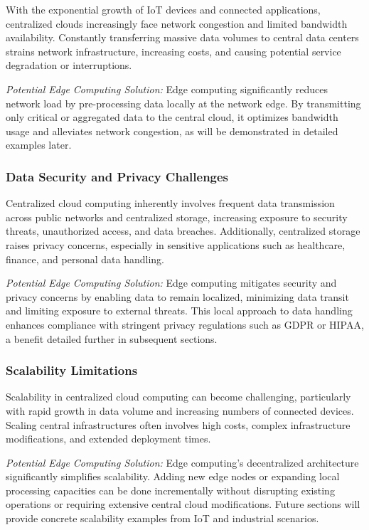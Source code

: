 \documentclass[runningheads]{llncs}
\begin{document}
With the exponential growth of IoT devices and connected applications, centralized clouds increasingly face network congestion and limited bandwidth availability. Constantly transferring massive data volumes to central data centers strains network infrastructure, increasing costs, and causing potential service degradation or interruptions.




\noindent\textit{Potential Edge Computing Solution:} Edge computing significantly reduces network load by pre-processing data locally at the network edge. By transmitting only critical or aggregated data to the central cloud, it optimizes bandwidth usage and alleviates network congestion, as will be demonstrated in detailed examples later.

\subsubsection{Data Security and Privacy Challenges}
Centralized cloud computing inherently involves frequent data transmission across public networks and centralized storage, increasing exposure to security threats, unauthorized access, and data breaches. Additionally, centralized storage raises privacy concerns, especially in sensitive applications such as healthcare, finance, and personal data handling.

\noindent\textit{Potential Edge Computing Solution:} Edge computing mitigates security and privacy concerns by enabling data to remain localized, minimizing data transit and limiting exposure to external threats. This local approach to data handling enhances compliance with stringent privacy regulations such as GDPR or HIPAA, a benefit detailed further in subsequent sections.

\subsubsection{Scalability Limitations}
Scalability in centralized cloud computing can become challenging, particularly with rapid growth in data volume and increasing numbers of connected devices. Scaling central infrastructures often involves high costs, complex infrastructure modifications, and extended deployment times.

\noindent\textit{Potential Edge Computing Solution:} Edge computing's decentralized architecture significantly simplifies scalability. Adding new edge nodes or expanding local processing capacities can be done incrementally without disrupting existing operations or requiring extensive central cloud modifications. Future sections will provide concrete scalability examples from IoT and industrial scenarios.
\end{document}
